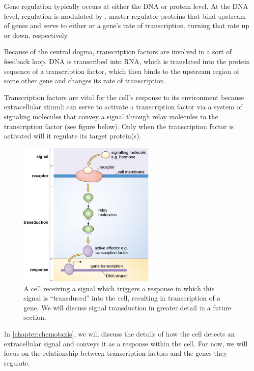 Gene regulation typically occurs at either the DNA or protein level. At the DNA level, regulation is modulated by , master regulator proteins that bind upstream of genes and serve to either  or  a gene's rate of transcription, turning that rate up or down, respectively.

Because of the central dogma, transcription factors are involved in a sort of feedback loop. DNA is transcribed into RNA, which is translated into the protein sequence of a transcription factor, which then binds to the upstream region of some other gene and changes its rate of transcription.

Transcription factors are vital for the cell's response to its environment because extracellular stimuli can serve to activate a transcription factor via a system of signaling molecules that convey a signal through relay molecules to the transcription factor (see figure below). Only when the transcription factor is activated will it regulate its target protein(s).

\begin{figure}[h]
\centering
\mySfFamily
\includegraphics[width = 0.6\textwidth]{../images/signal_pathway.jpg}
\caption{A cell receiving a signal which triggers a response in which this signal is ``transduced'' into the cell, resulting in transcription of a gene. We will discuss signal transduction in greater detail in a future section.}
\label{fig:genetic_code}
\end{figure}

In \autoref{chapter:chemotaxis}, we will discuss the details of how the cell detects an extracellular signal and conveys it as a response within the cell. For now, we will focus on the relationship between transcription factors and the genes they regulate.

